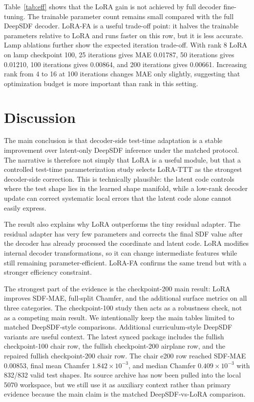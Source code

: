 \documentclass[letterpaper]{article}
\begin{document}
Table~\ref{tab:eff} shows that the LoRA gain is not achieved by full decoder fine-tuning. The trainable parameter count remains small compared with the full DeepSDF decoder. LoRA-FA is a useful trade-off point: it halves the trainable parameters relative to LoRA and runs faster on this row, but it is less accurate. Lamp ablations further show the expected iteration trade-off. With rank 8 LoRA on lamp checkpoint 100, 25 iterations gives MAE 0.01787, 50 iterations gives 0.01210, 100 iterations gives 0.00864, and 200 iterations gives 0.00661. Increasing rank from 4 to 16 at 100 iterations changes MAE only slightly, suggesting that optimization budget is more important than rank in this setting.

\section{Discussion}

The main conclusion is that decoder-side test-time adaptation is a stable improvement over latent-only DeepSDF inference under the matched protocol. The narrative is therefore not simply that LoRA is a useful module, but that a controlled test-time parameterization study selects LoRA-TTT as the strongest decoder-side correction. This is technically plausible: the latent code controls where the test shape lies in the learned shape manifold, while a low-rank decoder update can correct systematic local errors that the latent code alone cannot easily express.

The result also explains why LoRA outperforms the tiny residual adapter. The residual adapter has very few parameters and corrects the final SDF value after the decoder has already processed the coordinate and latent code. LoRA modifies internal decoder transformations, so it can change intermediate features while still remaining parameter-efficient. LoRA-FA confirms the same trend but with a stronger efficiency constraint.

The strongest part of the evidence is the checkpoint-200 main result: LoRA improves SDF-MAE, full-split Chamfer, and the additional surface metrics on all three categories. The checkpoint-100 study then acts as a robustness check, not as a competing main result. We intentionally keep the main tables limited to matched DeepSDF-style comparisons. Additional curriculum-style DeepSDF variants are useful context. The latest synced package includes the fullish checkpoint-100 chair row, the fullish checkpoint-200 airplane row, and the repaired fullish checkpoint-200 chair row. The chair e200 row reached SDF-MAE $0.00853$, final mean Chamfer $1.842\times 10^{-3}$, and median Chamfer $0.409\times 10^{-3}$ with 832/832 valid test shapes. Its source archive has now been pulled into the local 5070 workspace, but we still use it as auxiliary context rather than primary evidence because the main claim is the matched DeepSDF-vs-LoRA comparison.
\end{document}
